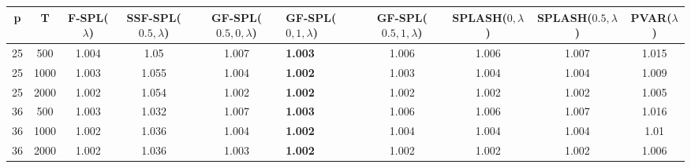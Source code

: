 \begin{tabular}{ccccclcccc}
\hline
  p  &  T   &  F-SPL($\lambda$)  &  SSF-SPL($0.5, \lambda$)  &  GF-SPL($0.5, 0, \lambda$)  & GF-SPL($0, 1, \lambda$)   &  GF-SPL($0.5, 1, \lambda$)  &  SPLASH($0, \lambda$)  &  SPLASH($0.5, \lambda$)  &  PVAR($\lambda$)  \\
\hline
 25  & 500  &       1.004        &           1.05            &            1.007            & \textbf{1.003}            &            1.006            &         1.006          &          1.007           &       1.015       \\
 25  & 1000 &       1.003        &           1.055           &            1.004            & \textbf{1.002}            &            1.003            &         1.004          &          1.004           &       1.009       \\
 25  & 2000 &       1.002        &           1.054           &            1.002            & \textbf{1.002}            &            1.002            &         1.002          &          1.002           &       1.005       \\
 36  & 500  &       1.003        &           1.032           &            1.007            & \textbf{1.003}            &            1.006            &         1.006          &          1.007           &       1.016       \\
 36  & 1000 &       1.002        &           1.036           &            1.004            & \textbf{1.002}            &            1.004            &         1.004          &          1.004           &       1.01        \\
 36  & 2000 &       1.002        &           1.036           &            1.003            & \textbf{1.002}            &            1.002            &         1.002          &          1.002           &       1.006       \\
\hline
\end{tabular}